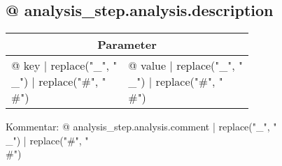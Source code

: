 \subsection{{@ analysis_step.analysis.description }}

\vspace*{1ex}
\begin{tabular}{ll}
\toprule
\multicolumn{2}{c}{\textbf{Parameter}}
\\
\midrule
{@ key | replace("_", "\\_") | replace("#", "\\#") } & {@ value | replace("_", "\\_") | replace("#", "\\#") }
\\
\bottomrule
\end{tabular}
\vspace*{1ex}

Kommentar: {@ analysis_step.analysis.comment | replace("_", "\\_") | replace("#", "\\#") }
